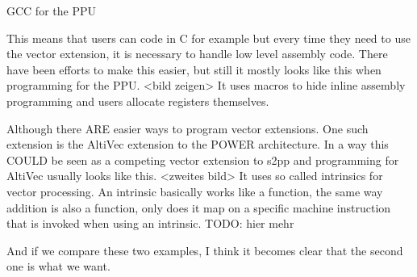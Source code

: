 \documentclass[10pt,aspectratio=169]{beamer}
\begin{document}
\begin{frame}[fragile]{GCC for the PPU}
{		This means that users can code in C for example but every time they need to use the vector extension, it is necessary to handle low level assembly code.
		There have been efforts to make this easier, but still it mostly looks like this when programming for the PPU.
		<bild zeigen>
		It uses macros to hide inline assembly programming and users allocate registers themselves.

		Although there ARE easier ways to program vector extensions.
		One such extension is the AltiVec extension to the POWER architecture.
		In a way this COULD be seen as a competing vector extension to s2pp and programming for AltiVec usually looks like this.
		<zweites bild>
		It uses so called intrinsics for vector processing.
		An intrinsic basically works like a function, the same way addition is also a function, only does it map on a specific machine instruction that is invoked when using an intrinsic.
		TODO: hier mehr

		And if we compare these two examples, I think it becomes clear that the second one is what we want.
}
\end{frame}
\end{document}

